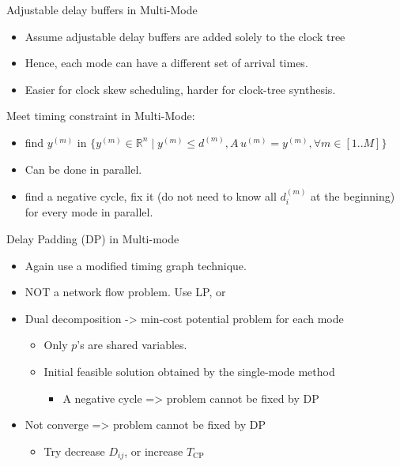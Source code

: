 \documentclass[
  ignorenonframetext,
]{beamer}
\providecommand{\tightlist}{%
  \setlength{\itemsep}{0pt}\setlength{\parskip}{0pt}}
\begin{document}
\begin{frame}{Adjustable delay buffers in Multi-Mode}
\protect\hypertarget{adjustable-delay-buffers-in-multi-mode}{}
\begin{itemize}
\tightlist
\item
  Assume adjustable delay buffers are added solely to the clock tree
\item
  Hence, each mode can have a different set of arrival times.
\item
  Easier for clock skew scheduling, harder for clock-tree synthesis.
\end{itemize}
\end{frame}

\begin{frame}{Meet timing constraint in Multi-Mode:}
\protect\hypertarget{meet-timing-constraint-in-multi-mode}{}
\begin{itemize}
\tightlist
\item
  find \(y^{(m)}\) in
  \(\{y^{(m)} \in \mathbb{R}^n \mid y^{(m)} \leq d^{(m)}, A\,u^{(m)} = y^{(m)}, \forall m\in[1..M]\}\)
\item
  Can be done in parallel.
\item
  find a negative cycle, fix it (do not need to know all \(d_i^{(m)}\)
  at the beginning) for every mode in parallel.
\end{itemize}
\end{frame}

\begin{frame}{Delay Padding (DP) in Multi-mode}
\protect\hypertarget{delay-padding-dp-in-multi-mode}{}
\begin{itemize}
\tightlist
\item
  Again use a modified timing graph technique.
\item
  NOT a network flow problem. Use LP, or
\item
  Dual decomposition -\textgreater{} min-cost potential problem for each
  mode

  \begin{itemize}
  \tightlist
  \item
    Only \(p\)'s are shared variables.
  \item
    Initial feasible solution obtained by the single-mode method

    \begin{itemize}
    \tightlist
    \item
      A negative cycle =\textgreater{} problem cannot be fixed by DP
    \end{itemize}
  \end{itemize}
\item
  Not converge =\textgreater{} problem cannot be fixed by DP

  \begin{itemize}
  \tightlist
  \item
    Try decrease \(D_{ij}\), or increase \(T_\text{CP}\)
  \end{itemize}
\end{itemize}
\end{frame}
\end{document}
